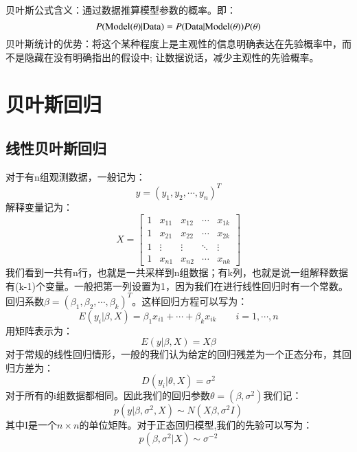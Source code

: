 贝叶斯公式含义：通过数据推算模型参数的概率。即：
\begin{equation}
    P({\rm{Model}} (\theta)|{\rm{Data}})=
    P({\rm{Data}}|{\rm{Model}}(\theta))P(\theta)
\end{equation}
贝叶斯统计的优势：将这个某种程度上是主观性的信息明确表达在先验概率中，而不是隐藏在没有明确指出的假设中; 让数据说话，减少主观性的先验概率。





\section{贝叶斯回归}
\subsection{线性贝叶斯回归}
对于有n组观测数据，一般记为：
\begin{equation}
    y=(y_1,y_2,\cdots,y_n)^T
\end{equation}
解释变量记为：
\begin{equation}
    X=\begin{bmatrix}  
        1 & x_{11} & x_{12} & \cdots & x_{1k} \\
        1 & x_{21} & x_{22} & \cdots & x_{2k} \\
        1 & \vdots & \vdots & \ddots & \vdots \\
        1 & x_{n1} & x_{n2} & \cdots & x_{nk}
      \end{bmatrix}
\end{equation}
我们看到一共有n行，也就是一共采样到n组数据；有k列，也就是说一组解释数据有(k-1)个变量。一般把第一列设置为1，因为我们在进行线性回归时有一个常数。回归系数$\beta = (\beta_1,\beta_2,\cdots,\beta_k)^T$。这样回归方程可以写为：
\begin{equation}
    E(y_i|\beta,X)=\beta_1 x_{i1}+\cdots+\beta_kx_{ik} \qquad i=1,\cdots,n
\end{equation}
用矩阵表示为：
\begin{equation}
    E(y|\beta,X)=X\beta
\end{equation}
对于常规的线性回归情形，一般的我们认为给定的回归残差为一个正态分布，其回归方差为：
\begin{equation*}
    D(y_i|\theta,X)=\sigma^2
\end{equation*}
对于所有的i组数据都相同。因此我们的回归参数$\theta=(\beta,\sigma^2)$我们记：
\begin{equation}
    p(y|\beta,\sigma^2,X)\sim N(X\beta,\sigma^2I)
\end{equation}
其中I是一个$n\times n$的单位矩阵。对于正态回归模型,我们的先验可以写为：
\begin{equation}
    p(\beta,\sigma^2|X)\sim \sigma^{-2}
\end{equation}

